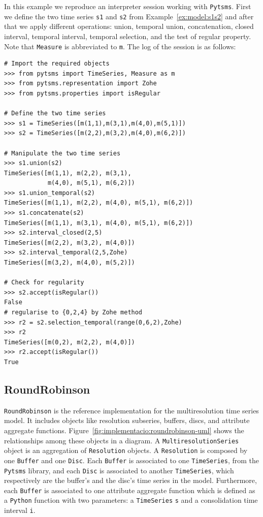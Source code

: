 \begin{example}
  \label{ex:pytsms:example}
  In this example we reproduce an interpreter session working with
  \texttt{Pytsms}. First we define the two time series \texttt{s1} and
  \texttt{s2} from Example~\ref{ex:model:s1s2} and after that we apply
  different operations: union, temporal union, concatenation, closed
  interval, \zohe{} temporal interval, \zohe{} temporal selection, and
  the test of regular property. Note that \texttt{Measure} is
  abbreviated to \texttt{m}. The log of the session is as follows:

  {\small
\begin{verbatim}
# Import the required objects
>>> from pytsms import TimeSeries, Measure as m
>>> from pytsms.representation import Zohe
>>> from pytsms.properties import isRegular

# Define the two time series
>>> s1 = TimeSeries([m(1,1),m(3,1),m(4,0),m(5,1)])
>>> s2 = TimeSeries([m(2,2),m(3,2),m(4,0),m(6,2)])

# Manipulate the two time series
>>> s1.union(s2)
TimeSeries([m(1,1), m(2,2), m(3,1), 
            m(4,0), m(5,1), m(6,2)])
>>> s1.union_temporal(s2)
TimeSeries([m(1,1), m(2,2), m(4,0), m(5,1), m(6,2)])
>>> s1.concatenate(s2) 
TimeSeries([m(1,1), m(3,1), m(4,0), m(5,1), m(6,2)])
>>> s2.interval_closed(2,5)
TimeSeries([m(2,2), m(3,2), m(4,0)])
>>> s2.interval_temporal(2,5,Zohe)
TimeSeries([m(3,2), m(4,0), m(5,2)])

# Check for regularity
>>> s2.accept(isRegular())
False
# regularise to {0,2,4} by Zohe method
>>> r2 = s2.selection_temporal(range(0,6,2),Zohe)
>>> r2
TimeSeries([m(0,2), m(2,2), m(4,0)])
>>> r2.accept(isRegular())
True
\end{verbatim}
}
\end{example}





\subsection{RoundRobinson}

\texttt{RoundRobinson} is the reference implementation for the
multiresolution time series model. It includes objects like
resolution subseries, buffers, discs, and attribute aggregate
functions. Figure~\ref{fig:implementacio:roundrobinson-uml} shows the
relationships among these objects in a  diagram. 
%
A \texttt{MultiresolutionSeries} object is an aggregation of
\texttt{Resolution} objects. A \texttt{Resolution} is composed by one
\texttt{Buffer} and one \texttt{Disc}. Each \texttt{Buffer} is
associated to one \texttt{TimeSeries}, from the \texttt{Pytsms}
library, and each \texttt{Disc} is associated to another
\texttt{TimeSeries}, which respectively are the buffer's
and the disc's time series in the  model. Furthermore, each
\texttt{Buffer} is associated to one attribute aggregate function
which is defined as a \texttt{Python} function with two parameters: a
\texttt{TimeSeries} \texttt{s} and a consolidation time interval
\texttt{i}.

